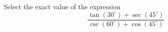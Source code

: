 \documentclass{ximera}
\author{Ivo Terek}
\begin{document}
\begin{exercise}

Select the exact value of the expression $$\frac{\tan(30^\circ) + \sec(45^\circ)}{\csc(60^\circ) + \cos(45^\circ)}$$
\begin{multipleChoice}
\end{multipleChoice}


\end{exercise}
\end{document}
